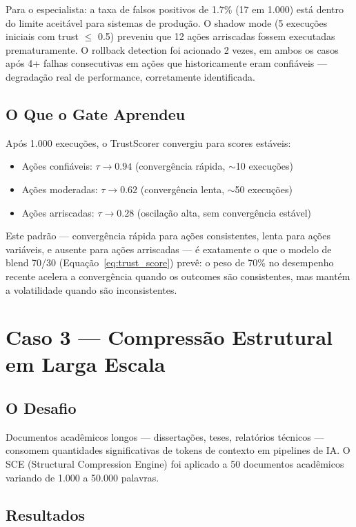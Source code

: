 Para o especialista: a taxa de falsos positivos de 1.7\% (17 em 1.000) está dentro do limite aceitável para sistemas de produção. O shadow mode (5 execuções iniciais com trust $\leq$ 0.5) preveniu que 12 ações arriscadas fossem executadas prematuramente. O rollback detection foi acionado 2 vezes, em ambos os casos após 4+ falhas consecutivas em ações que historicamente eram confiáveis — degradação real de performance, corretamente identificada.

\subsection{O Que o Gate Aprendeu}

Após 1.000 execuções, o TrustScorer convergiu para scores estáveis:

\begin{itemize}
    \item Ações confiáveis: $\tau \rightarrow 0.94$ (convergência rápida, $\sim$10 execuções)
    \item Ações moderadas: $\tau \rightarrow 0.62$ (convergência lenta, $\sim$50 execuções)
    \item Ações arriscadas: $\tau \rightarrow 0.28$ (oscilação alta, sem convergência estável)
\end{itemize}

Este padrão — convergência rápida para ações consistentes, lenta para ações variáveis, e ausente para ações arriscadas — é exatamente o que o modelo de blend 70/30 (Equação~\ref{eq:trust_score}) prevê: o peso de 70\% no desempenho recente acelera a convergência quando os outcomes são consistentes, mas mantém a volatilidade quando são inconsistentes.

\section{Caso 3 — Compressão Estrutural em Larga Escala}

\subsection{O Desafio}

Documentos acadêmicos longos — dissertações, teses, relatórios técnicos — consomem quantidades significativas de tokens de contexto em pipelines de IA. O SCE (Structural Compression Engine) foi aplicado a 50 documentos acadêmicos variando de 1.000 a 50.000 palavras.

\subsection{Resultados}

